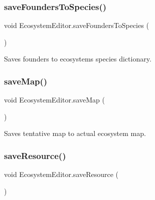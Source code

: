 \mbox{\label{class_ecosystem_editor_a5aa46063ae1157099b036e81cdcbe2ad}} 
\subsubsection{\texorpdfstring{save\+Founders\+To\+Species()}{saveFoundersToSpecies()}}
{\footnotesize\ttfamily void Ecosystem\+Editor.\+save\+Founders\+To\+Species (\begin{DoxyParamCaption}{ }\end{DoxyParamCaption})}



Saves founders to ecosystem\textquotesingle{}s species dictionary. 

\mbox{\label{class_ecosystem_editor_acfbb3166d4c0ef8567a36cf66b456141}} 
\subsubsection{\texorpdfstring{save\+Map()}{saveMap()}}
{\footnotesize\ttfamily void Ecosystem\+Editor.\+save\+Map (\begin{DoxyParamCaption}{ }\end{DoxyParamCaption})}



Saves tentative map to actual ecosystem map. 

\mbox{\label{class_ecosystem_editor_a1d369adb1216181a3db5cdde1baf50af}} 
\subsubsection{\texorpdfstring{save\+Resource()}{saveResource()}}
{\footnotesize\ttfamily void Ecosystem\+Editor.\+save\+Resource (\begin{DoxyParamCaption}{ }\end{DoxyParamCaption})}



